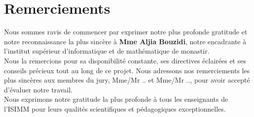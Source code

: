 \thispagestyle{empty}

\chapter*{Remerciements}

Nous sommes ravis de commencer par exprimer notre plus profonde gratitude et notre reconnaissance la plus sincère à \textbf{Mme Aljia Bouzidi}, notre encadrante à l'institut supérieur d'informatique et de mathématique de monastir.\\

Nous la remercions pour sa disponibilité constante, ses directives éclairées et ses conseils précieux tout au long de ce projet. Nous adressons nos remerciements les plus sincères aux membres du jury, Mme/Mr .. et Mme/Mr .., pour avoir accepté d'évaluer notre travail.\\

Nous exprimons notre gratitude la plus profonde à tous les enseignants de l'ISIMM pour leurs qualités scientifiques et pédagogiques exceptionnelles.
